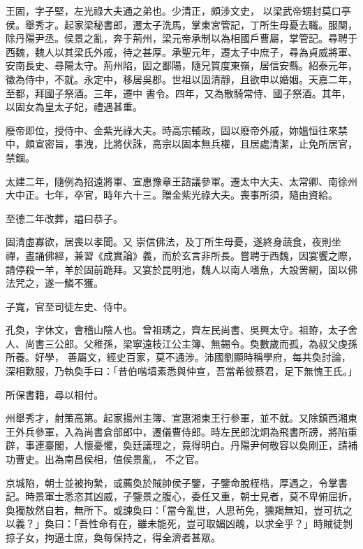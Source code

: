 \begin{pinyinscope}
 王固，字子堅，左光祿大夫通之弟也。少清正，頗涉文史，
 以梁武帝甥封莫口亭侯。舉秀才。起家梁秘書郎，遷太子洗馬，掌東宮管記，丁所生母憂去職。服闋，除丹陽尹丞。侯景之亂，奔于荊州，梁元帝承制以為相國戶曹屬，掌管記。尋聘于西魏，魏人以其梁氏外戚，待之甚厚。承聖元年，遷太子中庶子，尋為貞威將軍、安南長史、尋陽太守。荊州陷，固之鄱陽，隨兄質度東嶺，居信安縣。紹泰元年，徵為侍中，不就。永定中，移居吳郡。世祖以固清靜，且欲申以婚姻。天嘉二年，至都，拜國子祭酒。三年，遷中
 書令。四年，又為散騎常侍、國子祭酒。其年，以固女為皇太子妃，禮遇甚重。



 廢帝即位，授侍中、金紫光祿大夫。時高宗輔政，固以廢帝外戚，妳媼恒往來禁中，頗宣密旨，事洩，比將伏誅，高宗以固本無兵權，且居處清潔，止免所居官，禁錮。



 太建二年，隨例為招遠將軍、宣惠豫章王諮議參軍。遷太中大夫、太常卿、南徐州大中正。七年，卒官，時年六十三。贈金紫光祿大夫。喪事所須，隨由資給。



 至德二年改葬，謚曰恭子。



 固清虛寡欲，居喪以孝聞。又
 崇信佛法，及丁所生母憂，遂終身蔬食，夜則坐禪，晝誦佛經，兼習《成實論》義，而於玄言非所長。嘗聘于西魏，因宴饗之際，請停殺一羊，羊於固前跪拜。又宴於昆明池，魏人以南人嗜魚，大設罟網，固以佛法咒之，遂一鱗不獲。



 子寬，官至司徒左史、侍中。



 孔奐，字休文，會稽山陰人也。曾祖琇之，齊左民尚書、吳興太守。祖臶，太子舍人、尚書三公郎。父稚孫，梁寧遠枝江公主簿、無錫令。奐數歲而孤，為叔父虔孫所養。好學，
 善屬文，經史百家，莫不通涉。沛國劉顯時稱學府，每共奐討論，深相歎服，乃執奐手曰：「昔伯喈墳素悉與仲宣，吾當希彼蔡君，足下無愧王氏。」



 所保書籍，尋以相付。



 州舉秀才，射策高第。起家揚州主簿、宣惠湘東王行參軍，並不就。又除鎮西湘東王外兵參軍，入為尚書倉部郎中，遷儀曹侍郎。時左民郎沈炯為飛書所謗，將陷重辟，事連臺閣，人懷憂懼，奐廷議理之，竟得明白。丹陽尹何敬容以奐剛正，請補功曹史。出為南昌侯相，值侯景亂，
 不之官。



 京城陷，朝士並被拘縶，或薦奐於賊帥侯子鑒，子鑒命脫桎梏，厚遇之，令掌書記。時景軍士悉恣其凶威，子鑒景之腹心，委任又重，朝士見者，莫不卑俯屈折，奐獨敖然自若，無所下。或諫奐曰：「當今亂世，人思茍免，獯羯無知，豈可抗之以義？」奐曰：「吾性命有在，雖未能死，豈可取媚凶醜，以求全乎？」時賊徒剝掠子女，拘逼士庶，奐每保持之，得全濟者甚眾。




\end{pinyinscope}
